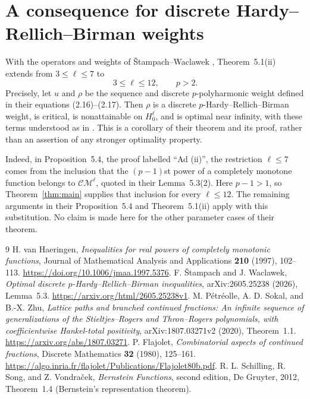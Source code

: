 \documentclass[11pt]{article}
\newcommand{\CM}{\mathcal{CM}}
\begin{document}
\section{A consequence for discrete Hardy--Rellich--Birman weights}

With the operators and weights of \v Stampach--Waclawek \cite{SW},
Theorem~5.1(ii) extends from $3\le\ell\le7$ to
\[
3\le\ell\le12,\qquad p>2.
\]
Precisely, let $u$ and $\rho$ be the sequence and discrete $p$-polyharmonic
weight defined in their equations (2.16)--(2.17). Then $\rho$ is a discrete
$p$-Hardy--Rellich--Birman weight, is critical, is nonattainable on
$H_0^\ell$, and is optimal near infinity, with these terms understood as in
\cite{SW}. This is a corollary of their theorem and its proof, rather than
an assertion of any stronger optimality property.

Indeed, in Proposition~5.4, the proof labelled ``Ad (ii)'', the restriction
$\ell\le7$ comes from the inclusion that the $(p-1)$st power of a completely
monotone function belongs to $\CM^\ell$, quoted in their Lemma~5.3(2).
Here $p-1>1$, so Theorem~\ref{thm:main} supplies that inclusion for every
$\ell\le12$. The remaining arguments in their Proposition~5.4 and
Theorem~5.1(ii) apply with this substitution. No claim is made here for the
other parameter cases of their theorem.

\begin{thebibliography}{9}
 H. van Haeringen, \emph{Inequalities for real powers of completely
monotonic functions}, Journal of Mathematical Analysis and Applications
\textbf{210} (1997), 102--113.
\url{https://doi.org/10.1006/jmaa.1997.5376}.
 F. \v Stampach and J. Waclawek,
\emph{Optimal discrete $p$-Hardy--Rellich--Birman inequalities},
arXiv:2605.25238 (2026), Lemma~5.3.
\url{https://arxiv.org/html/2605.25238v1}.
 M. P\'etr\'eolle, A. D. Sokal, and B.-X. Zhu,
\emph{Lattice paths and branched continued fractions: An infinite sequence of
generalizations of the Stieltjes--Rogers and Thron--Rogers polynomials, with
coefficientwise Hankel-total positivity}, arXiv:1807.03271v2 (2020),
Theorem~1.1.
\url{https://arxiv.org/abs/1807.03271}.
 P. Flajolet, \emph{Combinatorial aspects of continued
fractions}, Discrete Mathematics \textbf{32} (1980), 125--161.
\url{https://algo.inria.fr/flajolet/Publications/Flajolet80b.pdf}.
 R. L. Schilling, R. Song, and Z. Vondra\v cek,
\emph{Bernstein Functions}, second edition, De Gruyter, 2012,
Theorem~1.4 (Bernstein's representation theorem).
\end{thebibliography}
\end{document}
